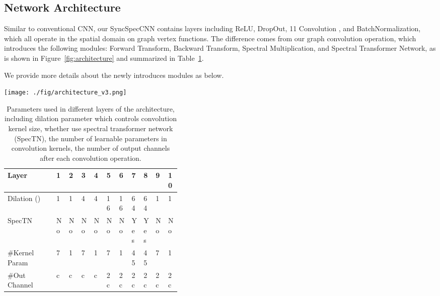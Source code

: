 \documentclass[10pt,twocolumn,letterpaper]{article}
\begin{document}
\subsection{Network Architecture}
Similar to conventional CNN, our SyncSpecCNN contains layers including  ReLU, DropOut, 11 Convolution \cite{szegedy2015going}, and BatchNormalization, which all operate in the spatial domain on graph vertex functions. The difference comes from our graph convolution operation, which introduces the following modules: Forward Transform, Backward Transform, Spectral Multiplication, and Spectral Transformer Network, as is shown in Figure~\ref{fig:architecture} and summarized in Table~\ref{tab:architecture}. 

We provide more details about the newly introduces modules as below.
\begin{figure*}
    \centering
    \texttt{[image: ./fig/architecture\_v3.png]}
    \caption{Architecture of our SyncSpecCNN. Spectral convolution is done through first transforming graph vertex functions into their spectral representation and then pointwise modulating it with a set of multipliers. The multiplied signal is transformed back to spatial domain to perform nonlinear operations. We introduce spectral transformer network to synchronize different spectral domains and allow better parameter sharing in spectral convolution. Convolution kernels are parametrized in a dilated fashion for effective multi-scale information aggregation.}
    \label{fig:architecture}
\end{figure*}

\begin{table}[]
\centering
{\footnotesize
\begin{tabular}{@{}p{0.25\linewidth}p{0.015\linewidth}p{0.015\linewidth}p{0.015\linewidth}p{0.015\linewidth}p{0.015\linewidth}p{0.015\linewidth}p{0.017\linewidth}p{0.016\linewidth}p{0.016\linewidth}p{0.015\linewidth}}
\toprule
Layer               & 1  & 2  & 3  & 4  & 5  & 6  & 7   & 8   & 9  & 10 \\ \midrule
Dilation () & 1  & 1  & 4  & 4  & 16 & 16 & 64   & 64   & 1  & 1  \\
SpecTN              & No & No & No & No & No & No & Yes & Yes & No & No \\
\#Kernel Param      & 7  & 1  & 7  & 1  & 7  & 1  & 45  & 45  & 7  & 1  \\
\#Out Channel    & c  & c  & c  & c  & 2c & 2c & 2c  & 2c  & 2c & 2c\\ \bottomrule
\end{tabular}
}
\caption{Parameters used in different layers of the architecture, including dilation parameter  which controls convolution kernel size, whether use spectral transformer network (SpecTN), the number of learnable parameters in convolution kernels, the number of output channels after each convolution operation.}
\label{tab:architecture}
\end{table}
\end{document}
